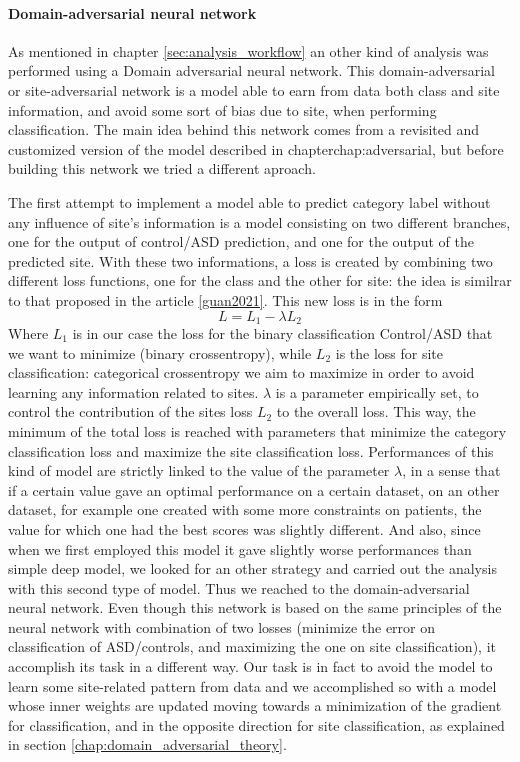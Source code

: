 \documentclass[11pt]{report}
\begin{document}
\paragraph{Domain-adversarial neural network}\hfill

As mentioned in chapter \ref{sec:analysis_workflow} an other kind of analysis was performed using a Domain adversarial neural network.
This domain-adversarial or site-adversarial network is a model able to earn from data both class and site information, and avoid some sort of bias due to site, when performing classification.
The main idea behind this network comes from a revisited and customized version of the model described in chapter{chap:adversarial}, but before building this network we tried a different aproach.

The first attempt to implement a model able to predict category label without any influence of site's information is a model consisting on two different branches, one for the output of control/ASD prediction, and one for the output of the predicted site.
With these two informations, a loss is created by combining two different loss functions, one for the class and the other for site: the idea is similrar to that proposed in the article \ref{guan2021}.
This new loss is in the form
\begin{equation}
L = L_1 - \lambda L_2
\end{equation}
Where $L_1$  is in our case the loss for the binary classification Control/ASD that we want to minimize (binary crossentropy), while $L_2$ is the loss for site classification: categorical crossentropy we aim to maximize in order to avoid learning any information related to sites. $\lambda $ is a parameter empirically set, to control the contribution of the sites loss $L_2$ to the overall loss.
This way, the minimum of the total loss is reached with parameters that minimize the category classification loss and maximize the site classification loss.
Performances of this kind of model are strictly linked to the value of the parameter $\lambda$, in a sense that if a certain value gave an optimal performance on a certain dataset, on an other dataset, for example one created with some more constraints on patients, the value for which one had the best scores was slightly different.
And also, since when we first employed this model it gave slightly worse performances than simple deep model, we looked for an other strategy and carried out the analysis with this second type of model.
Thus we reached to the domain-adversarial neural network.
Even though this network is based on the same principles of the neural network with combination of two losses (minimize the error on classification of ASD/controls, and maximizing the one on site classification), it accomplish its task in a different way.
Our task is in fact to avoid the model to learn some site-related pattern from data and we accomplished so with a model whose inner weights are updated moving towards a minimization of the gradient for classification, and in the opposite direction for site classification, as explained in section \ref{chap:domain_adversarial_theory}.
\end{document}
